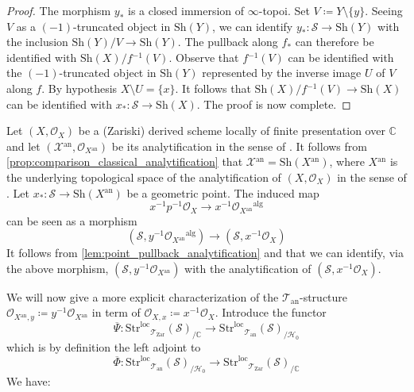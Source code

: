 \documentclass[12pt,a4paper,reqno]{amsart}
\theoremstyle{plain}
\theoremstyle{definition}
\theoremstyle{remark}
\numberwithin{equation}{section}
\begin{document}
\begin{proof}
	The morphism $y_*$ is a closed immersion of $\infty$-topoi.
	Set $V \coloneqq Y \setminus \{y\}$.
	Seeing $V$ as a $(-1)$-truncated object in ${\mathrm{Sh}}(Y)$, we can identify $y_* \colon {\mathcal S} \to {\mathrm{Sh}}(Y)$ with the inclusion ${\mathrm{Sh}}(Y)/V \to {\mathrm{Sh}}(Y)$.
	The pullback along $f_*$ can therefore be identified with ${\mathrm{Sh}}(X) / f{^{-1}}(V)$.
	Observe that $f{^{-1}}(V)$ can be identified with the $(-1)$-truncated object in ${\mathrm{Sh}}(Y)$ represented by the inverse image $U$ of $V$ along $f$.
	By hypothesis $X \setminus U = \{x\}$.
	It follows that ${\mathrm{Sh}}(X) / f{^{-1}}(V) \to {\mathrm{Sh}}(X)$ can be identified with $x_* \colon {\mathcal S} \to {\mathrm{Sh}}(X)$.
	The proof is now complete.
\end{proof}

Let $(X, {\mathcal O}_X)$ be a (Zariski) derived scheme locally of finite presentation over $\mathbb C$ and let $({\mathcal X}{^\mathrm{an}}, {\mathcal O}_{X{^\mathrm{an}}})$ be its analytification in the sense of \cite{DAG-IX}.
It follows from \cref{prop:comparison_classical_analytification} that ${\mathcal X}{^\mathrm{an}} = {\mathrm{Sh}}(X{^\mathrm{an}})$, where $X{^\mathrm{an}}$ is the underlying topological space of the analytification of $(X, {\mathcal O}_X)$ in the sense of \cite{SGA1}.
Let $x_* \colon {\mathcal S} \to {\mathrm{Sh}}(X{^\mathrm{an}})$ be a geometric point.
The induced map
\[ x{^{-1}} p{^{-1}} {\mathcal O}_X \to x{^{-1}} {\mathcal O}_{X{^\mathrm{an}}}{^\mathrm{alg}} \]
can be seen as a morphism
\[ ({\mathcal S}, y{^{-1}} {\mathcal O}_{X{^\mathrm{an}}}{^\mathrm{alg}}) \to ({\mathcal S}, x{^{-1}} {\mathcal O}_{X}) \]
It follows from \cref{lem:point_pullback_analytification} and \cite[Lemma 2.1.3]{DAG-V} that we can identify, via the above morphism, $({\mathcal S}, y{^{-1}} {\mathcal O}_{X{^\mathrm{an}}})$ with the analytification of $({\mathcal S}, x{^{-1}} {\mathcal O}_{X})$.

We will now give a more explicit characterization of the ${{\mathcal T}_{\mathrm{an}}}$-structure ${\mathcal O}_{X{^\mathrm{an}}, y} \coloneqq y{^{-1}} {\mathcal O}_{X{^\mathrm{an}}}$ in term of ${\mathcal O}_{X,x} \coloneqq x{^{-1}} {\mathcal O}_X$.
Introduce the functor
\[ \overline{\Psi} \colon {\mathrm{Str}^\mathrm{loc}}_{{\mathcal T}_{\mathrm{Zar}}}({\mathcal S})_{/\mathbb C} \to {\mathrm{Str}^\mathrm{loc}}_{{\mathcal T}_{\mathrm{an}}}({\mathcal S})_{/{\mathcal H}_0} \]
which is by definition the left adjoint to
\[ \overline{\Phi} \colon {\mathrm{Str}^\mathrm{loc}}_{{\mathcal T}_{\mathrm{an}}}({\mathcal S})_{/{\mathcal H}_0} \to {\mathrm{Str}^\mathrm{loc}}_{{\mathcal T}_{\mathrm{Zar}}}({\mathcal S})_{/\mathbb C} \]
We have:
\end{document}
